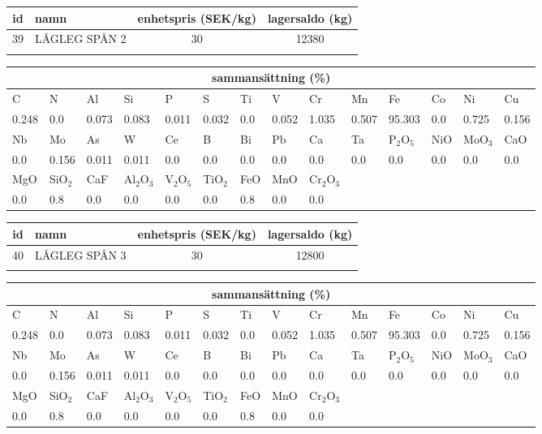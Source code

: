 \begin{center}
{\scriptsize\addtolength{\tabcolsep}{-3pt}
\begin{tabular}{clcc}
id&namn&enhetspris (SEK/kg)&lagersaldo (kg)\\
\hline
39&LÅGLEG SPÅN 2&30&12380\\\\
\end{tabular}
\begin{tabular}{llllllllllllll}
\multicolumn{14}{c}{sammansättning (\%)}\\
\hline
C&N&Al&Si&P&S&Ti&V&Cr&Mn&Fe&Co&Ni&Cu\\
\hline
0.248&0.0&0.073&0.083& 0.011&0.032&0.0&0.052& 1.035&0.507&95.303&0.0& 0.725&0.156\\
\hline
Nb&Mo&As&W&Ce&B&Bi&Pb&Ca&Ta&P$_2$O$_5$&NiO&MoO$_3$&CaO\\
\hline
0.0& 0.156& 0.011& 0.011& 0.0& 0.0& 0.0& 0.0& 0.0& 0.0& 0.0& 0.0& 0.0& 0.0\\
\hline
MgO&SiO$_2$&CaF&Al$_2$O$_3$&V$_2$O$_5$&TiO$_2$&FeO&MnO&Cr$_2$O$_3$\\
\hline
0.0& 0.8& 0.0& 0.0& 0.0& 0.0& 0.8& 0.0& 0.0\\
\end{tabular}
}
\end{center}

\begin{center}
{\scriptsize\addtolength{\tabcolsep}{-3pt}
\begin{tabular}{clcc}
id&namn&enhetspris (SEK/kg)&lagersaldo (kg)\\
\hline
40&LÅGLEG SPÅN 3&30&12800\\\\
\end{tabular}
\begin{tabular}{llllllllllllll}
\multicolumn{14}{c}{sammansättning (\%)}\\
\hline
C&N&Al&Si&P&S&Ti&V&Cr&Mn&Fe&Co&Ni&Cu\\
\hline
0.248&0.0&0.073&0.083& 0.011&0.032&0.0&0.052& 1.035&0.507&95.303&0.0& 0.725&0.156\\
\hline
Nb&Mo&As&W&Ce&B&Bi&Pb&Ca&Ta&P$_2$O$_5$&NiO&MoO$_3$&CaO\\
\hline
0.0& 0.156& 0.011& 0.011& 0.0& 0.0& 0.0& 0.0& 0.0& 0.0& 0.0& 0.0& 0.0& 0.0\\
\hline
MgO&SiO$_2$&CaF&Al$_2$O$_3$&V$_2$O$_5$&TiO$_2$&FeO&MnO&Cr$_2$O$_3$\\
\hline
0.0& 0.8& 0.0& 0.0& 0.0& 0.0& 0.8& 0.0& 0.0\\
\end{tabular}
}
\end{center}

